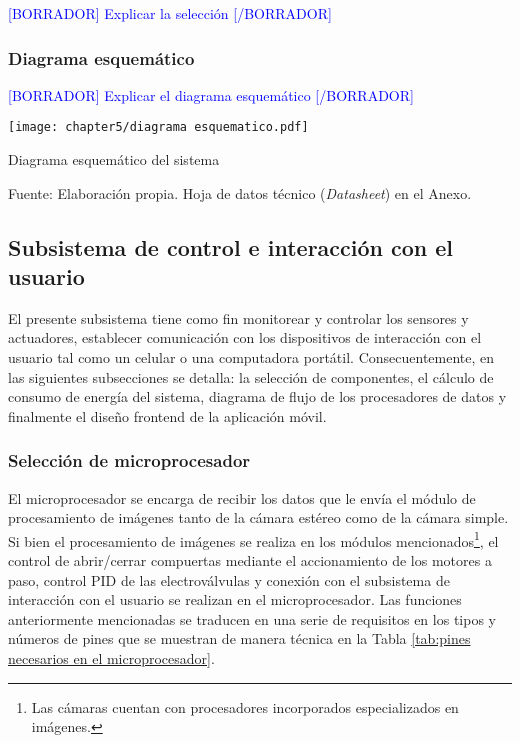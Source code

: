 \textcolor{blue}{[BORRADOR] Explicar la selección [/BORRADOR]}

\subsubsection{Diagrama esquemático} 

\textcolor{blue}{[BORRADOR] Explicar el diagrama esquemático [/BORRADOR]}

\begin{myfigure}[H]
	\centering
	\texttt{[image: chapter5/diagrama esquematico.pdf]}
	\caption{Diagrama esquemático del sistema}
	\begin{myflushleftportland}
		Fuente: Elaboración propia. Hoja de datos técnico (\textit{Datasheet}) en el Anexo.
	\end{myflushleftportland}
	\label{fig:diagrama esquematico}
\end{myfigure}



\subsection{Subsistema de control e interacción con el usuario}
\label{ssec:subsistema de control e interaccion con el usuario}

El presente subsistema tiene como fin monitorear y controlar los sensores y actuadores, establecer comunicación con los dispositivos de interacción con el usuario tal como un celular o una computadora portátil. Consecuentemente, en las siguientes subsecciones se detalla: la selección de componentes, el cálculo de consumo de energía del sistema, diagrama de flujo de los procesadores de datos y finalmente el diseño frontend de la aplicación móvil.


\subsubsection{Selección de microprocesador}
\label{sssec:seleccion de microprocesador}

El microprocesador se encarga de recibir los datos que le envía el módulo de procesamiento de imágenes tanto de la cámara estéreo como de la cámara simple. Si bien el procesamiento de imágenes se realiza en los módulos mencionados\footnote{Las cámaras cuentan con procesadores incorporados especializados en imágenes.}, el control de abrir/cerrar compuertas mediante el accionamiento de los motores a paso, control PID de las electroválvulas y conexión con el subsistema de interacción con el usuario se realizan en el microprocesador. Las funciones anteriormente mencionadas se traducen en una serie de requisitos en los tipos y números de pines que se muestran de manera técnica en la Tabla \ref{tab:pines necesarios en el microprocesador}.

